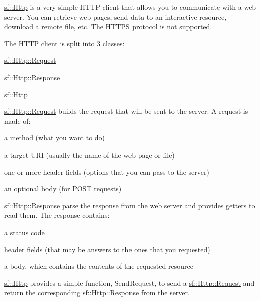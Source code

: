 \begin{DoxyVerb}\end{DoxyVerb}


\mbox{\hyperlink{classsf_1_1_http}{sf\+::\+Http}} is a very simple H\+T\+TP client that allows you to communicate with a web server. You can retrieve web pages, send data to an interactive resource, download a remote file, etc. The H\+T\+T\+PS protocol is not supported.

The H\+T\+TP client is split into 3 classes\+: \begin{DoxyItemize}
\item \mbox{\hyperlink{classsf_1_1_http_1_1_request}{sf\+::\+Http\+::\+Request}} \item \mbox{\hyperlink{classsf_1_1_http_1_1_response}{sf\+::\+Http\+::\+Response}} \item \mbox{\hyperlink{classsf_1_1_http}{sf\+::\+Http}}\end{DoxyItemize}
\mbox{\hyperlink{classsf_1_1_http_1_1_request}{sf\+::\+Http\+::\+Request}} builds the request that will be sent to the server. A request is made of\+: \begin{DoxyItemize}
\item a method (what you want to do) \item a target U\+RI (usually the name of the web page or file) \item one or more header fields (options that you can pass to the server) \item an optional body (for P\+O\+ST requests)\end{DoxyItemize}
\mbox{\hyperlink{classsf_1_1_http_1_1_response}{sf\+::\+Http\+::\+Response}} parse the response from the web server and provides getters to read them. The response contains\+: \begin{DoxyItemize}
\item a status code \item header fields (that may be answers to the ones that you requested) \item a body, which contains the contents of the requested resource\end{DoxyItemize}
\mbox{\hyperlink{classsf_1_1_http}{sf\+::\+Http}} provides a simple function, Send\+Request, to send a \mbox{\hyperlink{classsf_1_1_http_1_1_request}{sf\+::\+Http\+::\+Request}} and return the corresponding \mbox{\hyperlink{classsf_1_1_http_1_1_response}{sf\+::\+Http\+::\+Response}} from the server.

